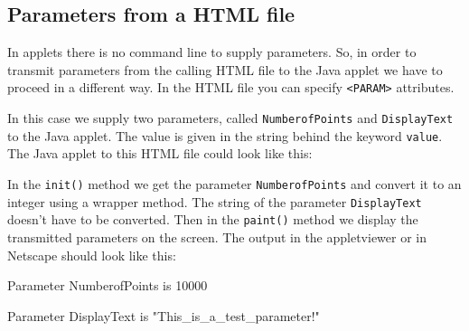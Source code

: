 \subsection{Parameters from a HTML file}
In applets there is no command line to supply parameters. 
So, in order to transmit 
parameters from the calling HTML file to the Java applet we have to
proceed in a different way.
In the HTML file you can
specify \verb|<PARAM>| attributes.

In this case we supply two parameters, called \verb|NumberofPoints| and
\verb|DisplayText| to the Java applet. The value is given in the string
behind the keyword \verb|value|. The Java applet to this HTML file
could look like this:

In the \verb|init()| method we get the parameter \verb|NumberofPoints|
and convert it to an integer using a wrapper method. The string 
of the parameter \verb|DisplayText| doesn't have
to be converted. Then in the \verb|paint()| method we display
the transmitted parameters on the screen. The output in the 
appletviewer or in Netscape should look like this:
\begin{sverbatim}
  Parameter NumberofPoints is 10000

  Parameter DisplayText is "This_is_a_test_parameter!"
\end{sverbatim}







